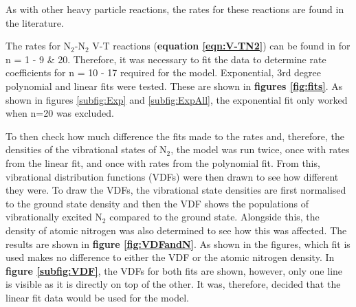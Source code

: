\documentclass[11pt, oneside]{article}   	%
\begin{document}
As with other heavy particle reactions, the rates for these reactions are found in the literature.


The rates for N$_2$-N$_2$ V-T reactions (\textbf{equation \ref{eqn:V-TN2}}) can be found in  \cite{Billing1979vv} for n = 1 - 9 \& 20.
Therefore, it was necessary to fit the data to determine rate coefficients for n = 10 - 17 required for the model.
Exponential, 3rd degree polynomial and linear fits were tested.
These are shown in \textbf{figures \ref{fig:fits}}.
As shown in figures \ref{subfig:Exp} and \ref{subfig:ExpAll}, the exponential fit only worked when n=20 was excluded.

To then check how much difference the fits made to the rates and, therefore, the densities of the vibrational states of N$_2$, the model was run twice, once with rates from the linear fit, and once with rates from the polynomial fit.
From this, vibrational distribution functions (VDFs) were then drawn to see how different they were.
To draw the VDFs, the vibrational state densities are first normalised to the ground state density and then the VDF shows the populations of vibrationally excited N$_2$ compared to the ground state.
Alongside this, the density of atomic nitrogen was also determined to see how this was affected.
The results are shown in \textbf{figure \ref{fig:VDFandN}}.
As shown in the figures, which fit is used makes no difference to either the VDF or the atomic nitrogen density.
In \textbf{figure \ref{subfig:VDF}}, the VDFs for both fits are shown, however, only one line is visible as it is directly on top of the other.
It was, therefore, decided that the linear fit data would be used for the model.



\end{document}
